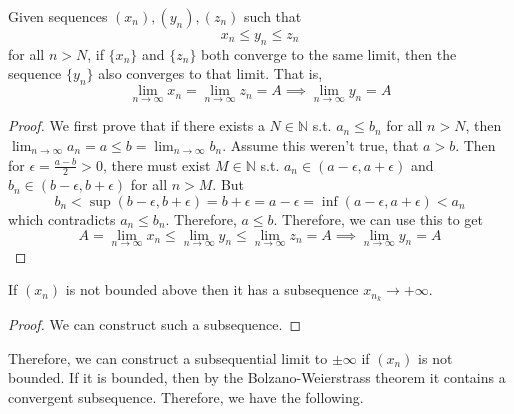   \begin{theorem}
    Given sequences $(x_n), (y_n), (z_n)$ such that 
    \begin{equation}
      x_n \leq y_n \leq z_n
    \end{equation}
    for all $n > N$, if $\{x_n\}$ and $\{z_n\}$ both converge to the same limit, then the sequence $\{y_n\}$ also converges to that limit. That is, 
    \begin{equation}
      \lim_{n \rightarrow \infty} x_n = \lim_{n \rightarrow \infty} z_n = A \implies \lim_{n \rightarrow \infty} y_n = A
    \end{equation}
  \end{theorem} 
  \begin{proof}
    We first prove that if there exists a $N \in \mathbb{N}$ s.t. $a_n \leq b_n$ for all $n > N$, then $\lim_{n \rightarrow \infty} a_n = a \leq b = \lim_{n \rightarrow \infty} b_n$. Assume this weren't true, that $a > b$. Then for $\epsilon = \frac{a - b}{2} > 0$, there must exist $M \in \mathbb{N}$ s.t. $a_n \in (a - \epsilon, a + \epsilon)$ and $b_n \in (b - \epsilon, b + \epsilon)$ for all $n > M$. But 
    \begin{equation}
      b_n < \sup (b - \epsilon, b + \epsilon) = b + \epsilon = a - \epsilon = \inf (a - \epsilon, a + \epsilon) < a_n
    \end{equation}
    which contradicts $a_n \leq b_n$. Therefore, $a \leq b$. Therefore, we can use this to get 
    \begin{equation}
      A = \lim_{n \rightarrow \infty} x_n \leq \lim_{n \rightarrow \infty} y_n \leq \lim_{n \rightarrow \infty} z_n = A \implies \lim_{n \rightarrow \infty} y_n = A
    \end{equation}
  \end{proof}

  \begin{theorem}
    If $(x_n)$ is not bounded above then it has a subsequence $x_{n_k} \rightarrow +\infty$. 
  \end{theorem}
  \begin{proof}
    We can construct such a subsequence. 
  \end{proof}

  Therefore, we can construct a subsequential limit to $\pm \infty$ if $(x_n)$ is not bounded. If it is bounded, then by the Bolzano-Weierstrass theorem it contains a convergent subsequence. Therefore, we have the following. 

